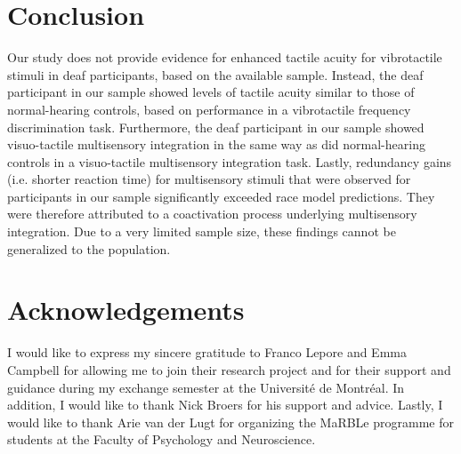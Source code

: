 \documentclass[12pt]{article}
\begin{document}
\section{Conclusion}
Our study does not provide evidence for enhanced tactile acuity for vibrotactile stimuli in deaf participants, based on the available sample. Instead, the deaf participant in our sample showed levels of tactile acuity similar to those of normal-hearing controls, based on performance in a vibrotactile frequency discrimination task. Furthermore, the deaf participant in our sample showed visuo-tactile multisensory integration in the same way as did normal-hearing controls in a visuo-tactile multisensory integration task. Lastly, redundancy gains (i.e. shorter reaction time) for multisensory stimuli that were observed for participants in our sample significantly exceeded race model predictions. They were therefore attributed to a coactivation process underlying multisensory integration. Due to a very limited sample size, these findings cannot be generalized to the population.
\section{Acknowledgements}
I would like to express my sincere gratitude to Franco Lepore and Emma Campbell for allowing me to join their research project and for their support and guidance during my exchange semester at the Université de Montréal. In addition, I would like to thank Nick Broers for his support and advice. Lastly, I would like to thank Arie van der Lugt for organizing the MaRBLe programme for students at the Faculty of Psychology and Neuroscience.
\printbibliography 
\end{document}
